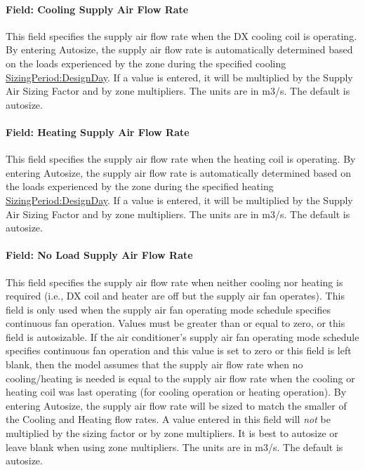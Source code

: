 \paragraph{Field: Cooling Supply Air Flow Rate}\label{field-cooling-supply-air-flow-rate-1}

This field specifies the supply air flow rate when the DX cooling coil is operating. By entering Autosize, the supply air flow rate is automatically determined based on the loads experienced by the zone during the specified cooling \hyperref[sizingperioddesignday]{SizingPeriod:DesignDay}. If a value is entered, it will be multiplied by the Supply Air Sizing Factor and by zone multipliers. The units are in m3/s. The default is autosize.

\paragraph{Field: Heating Supply Air Flow Rate}\label{field-heating-supply-air-flow-rate-1}

This field specifies the supply air flow rate when the heating coil is operating. By entering Autosize, the supply air flow rate is automatically determined based on the loads experienced by the zone during the specified heating \hyperref[sizingperioddesignday]{SizingPeriod:DesignDay}. If a value is entered, it will be multiplied by the Supply Air Sizing Factor and by zone multipliers. The units are in m3/s. The default is autosize.

\paragraph{Field: No Load Supply Air Flow Rate}\label{field-no-load-supply-air-flow-rate-1}

This field specifies the supply air flow rate when neither cooling nor heating is required (i.e., DX coil and heater are off but the supply air fan operates). This field is only used when the supply air fan operating mode schedule specifies continuous fan operation. Values must be greater than or equal to zero, or this field is autosizable. If the air conditioner's supply air fan operating mode schedule specifies continuous fan operation and this value is set to zero or this field is left blank, then the model assumes that the supply air flow rate when no cooling/heating is needed is equal to the supply air flow rate when the cooling or heating coil was last operating (for cooling operation or heating operation). By entering Autosize, the supply air flow rate will be sized to match the smaller of the Cooling and Heating flow rates. A value entered in this field will \emph{not} be multiplied by the sizing factor or by zone multipliers. It is best to autosize or leave blank when using zone multipliers. The units are in m3/s. The default is autosize.

